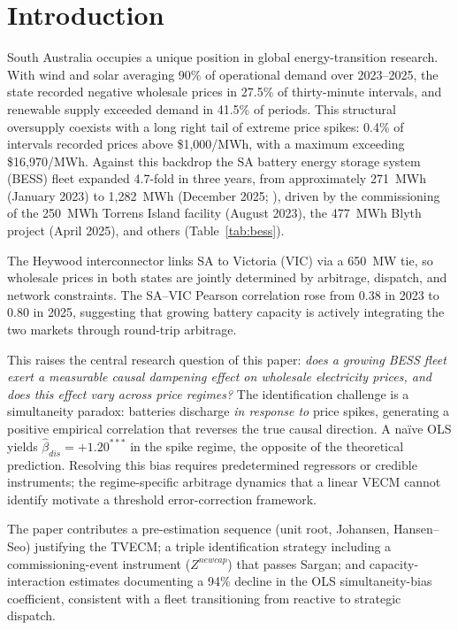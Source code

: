 \documentclass[12pt,a4paper]{article}
\begin{document}
\section{Introduction}
\label{sec:intro}

South Australia occupies a unique position in global energy-transition research.
With wind and solar averaging 90\% of operational demand over 2023--2025, the
state recorded negative wholesale prices in 27.5\% of thirty-minute intervals,
and renewable supply exceeded demand in 41.5\% of periods.  This structural oversupply
coexists with a long right tail of extreme price spikes: 0.4\% of intervals
recorded prices above \$1{,}000/MWh, with a maximum exceeding \$16{,}970/MWh.
Against this backdrop the SA battery energy storage system (BESS) fleet expanded
4.7-fold in three years, from approximately 271~MWh (January 2023) to 1{,}282~MWh
(December 2025; \cite{aemo2024isp}), driven by the commissioning of the 250~MWh
Torrens Island facility (August 2023), the 477~MWh Blyth project (April 2025),
and others (Table~\ref{tab:bess}).

The Heywood interconnector links SA to Victoria (VIC) via a 650~MW tie, so
wholesale prices in both states are jointly determined by arbitrage, dispatch,
and network constraints.  The SA--VIC Pearson correlation rose from 0.38 in
2023 to 0.80 in 2025, suggesting that growing battery capacity is actively
integrating the two markets through round-trip arbitrage.

This raises the central research question of this paper: \textit{does a growing
BESS fleet exert a measurable causal dampening effect on wholesale electricity
prices, and does this effect vary across price regimes?}  The identification
challenge is a simultaneity paradox: batteries discharge \textit{in response to}
price spikes, generating a positive empirical correlation that reverses the true
causal direction.  A na\"ive OLS yields $\hat{\beta}_{dis} = +1.20^{***}$ in the spike regime, the
opposite of the theoretical prediction.  Resolving this bias requires
predetermined regressors or credible instruments; the regime-specific
arbitrage dynamics that a linear VECM cannot identify motivate a threshold
error-correction framework.

The paper contributes a pre-estimation sequence (unit root, Johansen,
Hansen--Seo) justifying the TVECM; a triple identification strategy including
a commissioning-event instrument ($Z^{newcap}$) that passes Sargan; and
capacity-interaction estimates documenting a 94\% decline in the OLS
simultaneity-bias coefficient, consistent with a fleet transitioning from
reactive to strategic dispatch.
\end{document}
